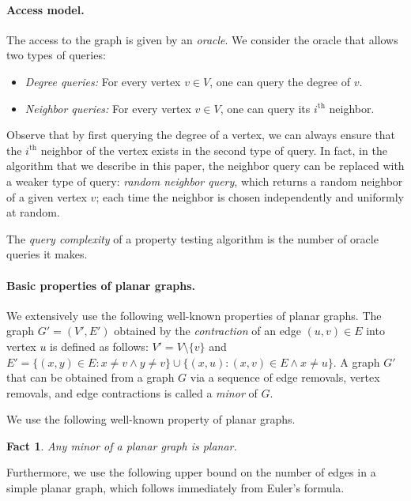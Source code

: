 \documentclass[11pt]{article}
\newtheorem{fact}[theorem]{Fact}
\begin{document}
\paragraph{Access model.}
The access to the graph is given by an \emph{oracle}. We consider the oracle that allows two types of queries:
\begin{itemize}
\item {\it Degree queries:} For every vertex $v \in V$, one can query the degree of $v$.
\item {\it Neighbor queries:} For every vertex $v \in V$, one can query its $i^{\text{th}}$ neighbor.
\end{itemize}
Observe that by first querying the degree of a vertex, we can always ensure that the $i^{\text{th}}$ neighbor of the vertex exists in the second type of query. In fact, in the algorithm that we describe in this paper, the neighbor query can be replaced with a weaker type of query: \emph{random neighbor query}, which returns a random neighbor of a given vertex $v$; each time the neighbor is chosen independently and uniformly at random.

The \emph{query complexity} of a property testing algorithm is the number of oracle queries it makes.



\paragraph{Basic properties of planar graphs.}

We extensively use the following well-known properties of planar graphs. The graph $G' = (V',E')$ obtained by the \emph{contraction} of an edge $(u,v) \in E$ into vertex $u$ is defined as follows: $V' = V \setminus \{v\}$ and $E' = \{(x,y)\in E: x \ne v \land y \ne v\} \cup \{(x,u) : (x,v) \in E \land x \ne u\}$. A graph $G'$ that can be obtained from a graph $G$ via a sequence of edge removals, vertex removals, and edge contractions is called a \emph{minor} of $G$.

We use the following well-known property of planar graphs.

\begin{fact}
\label{fact:planar_minor_planar}
Any minor of a planar graph is planar.
\end{fact}

Furthermore, we use the following upper bound on the number of edges in a simple planar graph, which follows immediately from Euler's formula.
\end{document}
